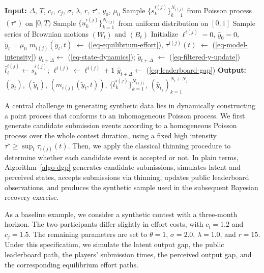\documentclass[mnsc]{informs3}
\begin{document}
\begin{algorithm}[!ht]
\caption{Synthetic Data Simulation}
\label{algo-dgp}
\begin{algorithmic}
\STATE \textbf{Input:}
	$\Delta$, $T$, $c_i$, $c_j$, $\sigma$, $\lambda$, $r$, $\tau^\star$, $y_0$, $\mu_0$
\STATE Sample $\{s_k^{i(j)}\}^{N_{i(j)}}_{k=1}$ from Poisson process $(\tau^\star)$ on $[0, T)$
\STATE Sample $\{u_k^{i(j)}\}^{N_{i(j)}}_{k=1}$ from uniform distribution on $[0, 1]$
\STATE Sample series of Brownian motions $(W_t)$ and $(B_t)$
\STATE Initialize $\ell^{i(j)}=0$, $\hat{y}_0 = 0$, $\tilde{y}_t=\mu_0$
    \STATE $m_{i(j)}(\tilde{y}_t, t)$  $\gets$ (\ref{eq-equilibrium-effort}), $\tau^{i(j)}(t)$ $\gets$ (\ref{eq-model-intensity})
    \hfill {}
    \STATE $y_{t+\Delta} \gets$ (\ref{eq-state-dynamics}); $\tilde{y}_{t+\Delta}$ $\gets$ (\ref{eq-filtered-y-update})
    \hfill {}
    \FOR{$s_{k}^{i(j)} \in [t, t+\Delta)$}
        	    \STATE $\hat{t}^{i(j)}_{\ell} \gets s_{k}^{i(j)}$; $\ell^{i(j)} \gets \ell^{i(j)}+1$
	    \hfill {}
	    \STATE $\hat{y}_{t+\Delta} \gets $ (\ref{eq-leaderboard-gap})
	    \hfill {}
        \ENDIF
    \ENDFOR
\ENDFOR
\STATE \textbf{Output:} $(y_t)$, $(\tilde{y}_t)$, $(m_{i(j)}(\tilde{y}_t, t))$, $\{\hat{t}_k^{i(j)}\}^{N_{i(j)}}_{k=1}$, $(\hat{y}_{t_k})_{k=1}^{N_i + N_j}$
\end{algorithmic}
\end{algorithm}

A central challenge in generating synthetic data lies in dynamically constructing a point process that conforms to an inhomogeneous Poisson process.
We first generate candidate submission events according to a homogeneous Poisson process over the whole contest duration, using a fixed high intensity $\tau^\star \ge \sup_t \tau_{i(j)}(t)$.
Then, we apply the classical thinning procedure \citep{lewis1979simulation} to determine whether each candidate event is accepted or not.
In plain terms, Algorithm~\ref{algo-dgp} generates candidate submissions, simulates latent and perceived states, accepts submissions via thinning, updates public leaderboard observations, and produces the synthetic sample used in the subsequent Bayesian recovery exercise.

As a baseline example, we consider a synthetic contest with a three-month horizon. The two participants differ slightly in effort costs, with $c_i = 1.2$ and $c_j = 1.5$. The remaining parameters are set to $\theta = 1$, $\sigma = 2.0$, $\lambda = 1.0$, and $r = 15$.
Under this specification, we simulate the latent output gap, the public leaderboard path, the players’ submission times, the perceived output gap, and the corresponding equilibrium effort paths.
\end{document}
